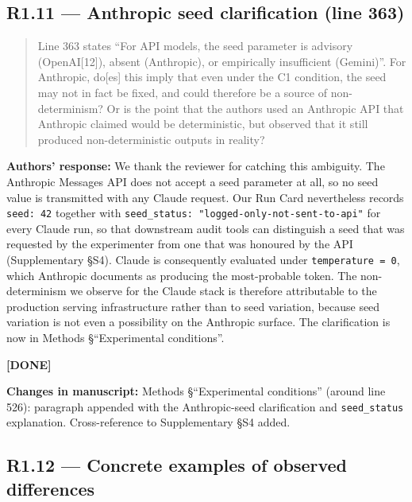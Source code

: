 \documentclass[11pt,a4paper]{article}
\newenvironment{revquote}{%
  \begin{quote}\small\itshape\color{revgray}
}{%
  \end{quote}
}
\newcommand{\response}[1]{\par\noindent\textbf{\color{revgreen}Authors' response:} #1\par}
\newcommand{\changes}[1]{\par\noindent\textbf{\color{revblue}Changes in manuscript:} #1\par}
\newcommand{\done}{\color{revgreen}\textbf{[DONE]}}
\begin{document}
\subsection*{R1.11 --- Anthropic seed clarification (line 363)}

\begin{revquote}
Line 363 states ``For API models, the seed parameter is advisory (OpenAI[12]), absent (Anthropic), or empirically insufficient (Gemini)''. For Anthropic, do[es] this imply that even under the C1 condition, the seed may not in fact be fixed, and could therefore be a source of non-determinism? Or is the point that the authors used an Anthropic API that Anthropic claimed would be deterministic, but observed that it still produced non-deterministic outputs in reality?
\end{revquote}

\response{We thank the reviewer for catching this ambiguity. The Anthropic Messages API does not accept a seed parameter at all, so no seed value is transmitted with any Claude request. Our Run Card nevertheless records \texttt{seed:\ 42} together with \texttt{seed\_status:\ "logged-only-not-sent-to-api"} for every Claude run, so that downstream audit tools can distinguish a seed that was requested by the experimenter from one that was honoured by the API (Supplementary §S4). Claude is consequently evaluated under \texttt{temperature\ =\ 0}, which Anthropic documents as producing the most-probable token. The non-determinism we observe for the Claude stack is therefore attributable to the production serving infrastructure rather than to seed variation, because seed variation is not even a possibility on the Anthropic surface. The clarification is now in Methods §``Experimental conditions''.} \done

\changes{Methods §``Experimental conditions'' (around line 526): paragraph appended with the Anthropic-seed clarification and \texttt{seed\_status} explanation. Cross-reference to Supplementary §S4 added.}

\subsection*{R1.12 --- Concrete examples of observed differences}
\end{document}
